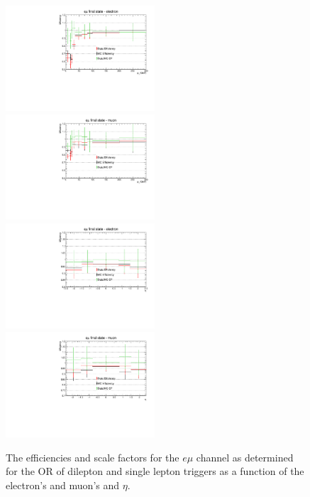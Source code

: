 \begin{figure}[ht]
\centering
\includegraphics[width=0.495\textwidth]{figs/background-estimation/triggerEfficiency/ttbar/muonElectron1_pT_SF.pdf}
\includegraphics[width=0.495\textwidth]{figs/background-estimation/triggerEfficiency/ttbar/muonElectron2_pT_SF.pdf}
\\
\includegraphics[width=0.495\textwidth]{figs/background-estimation/triggerEfficiency/ttbar/muonElectron1_eta_SF.pdf}
\includegraphics[width=0.495\textwidth]{figs/background-estimation/triggerEfficiency/ttbar/muonElectron2_eta_SF.pdf}
\caption{
The efficiencies and scale factors for the $e\mu$ channel as determined for the OR of dilepton and single lepton triggers as a function of the electron's and muon's \pT and $\eta$.
}
\label{fig:App_trigEff_emu}
\end{figure}

